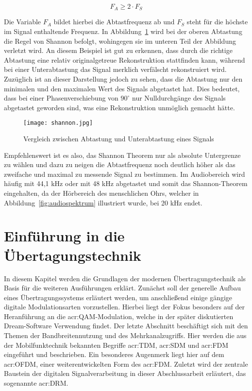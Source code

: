\begin{equation}
	\label{equ:abtast}
	F_{A} \geq 2 \cdot F_{S}
\end{equation}

Die Variable $F_{A}$ bildet hierbei die Abtastfrequenz ab und $F_{S}$ steht für die höchste im Signal enthaltende Frequenz. In Abbildung~\ref{fig:shannon} wird bei der oberen Abtastung die Regel von Shannon befolgt, wohingegen sie im unteren Teil der Abbildung verletzt wird. An diesem Beispiel ist gut zu erkennen, dass durch die richtige Abtastung eine relativ originalgetreue Rekonstruktion stattfinden kann, während bei einer Unterabtastung das Signal merklich verfälscht rekonstruiert wird. Zuzüglich ist an dieser Darstellung jedoch zu sehen, dass die Abtastung nur den minimalen und den maximalen Wert des Signals abgetastet hat.\cite{shannon} Dies bedeutet, dass bei einer Phasenverschiebung von $90^\circ$ nur Nulldurchgänge des Signals abgetastet geworden sind, was eine Rekonstruktion unmöglich gemacht hätte. 

\begin{figure}[H]
	\centering
	\texttt{[image: shannon.jpg]}
	\caption[Vergleich zwischen Abtastung und Unterabtastung eines Signals]{Vergleich zwischen Abtastung und Unterabtastung eines Signals} \cite{stotzaudio}
	\label{fig:shannon}
\end{figure}

Empfehlenswert ist es also, das Shannon Theorem nur als absolute Untergrenze zu wählen und dazu zu neigen die Abtastfrequenz noch deutlich höher als das zweifache und maximal zu messende Signal zu bestimmen.\cite{stotzaudio} Im Audiobereich wird häufig mit 44,1 kHz oder mit 48 kHz abgetastet und somit das Shannon-Theorem eingehalten, da der Hörbereich des menschlichen Ohrs, welcher in Abbildung~\ref{fig:audiospektrum} illustriert wurde, bei 20 kHz endet. \cite{masteraudio}


\section{Einführung in die Übertagungstechnik}
\label{subsec:uebertragung}
In diesem Kapitel werden die Grundlagen der modernen Übertragungstechnik als Basis für die weiteren Ausführungen erklärt. Zunächst soll der generelle Aufbau eines Übertragungssystems erläutert werden, um anschließend einige gängige digitale Modulationsarten vorzustellen. Hierbei liegt der Fokus besonders auf der Heranführung an die \gls{acr:QAM}-Modulation, welche in der später diskutierten Dream-Software Verwendung findet. Der letzte Abschnitt beschäftigt sich mit den Themen der Bandbreitennutzung und des Mehrkanalzugriffs. Hier werden die aus der Mobilfunktechnik bekannten Begriffe \gls{acr:TDM}, \gls{acr:SDM} und \gls{acr:FDM} eingeführt und beschrieben. Ein besonderes Augenmerk liegt hier auf dem \gls{acr:OFDM}, einer weiterentwickelten Form des \gls{acr:FDM}. Zuletzt wird der zentrale Baustein der digitalen Signalverarbeitung in dieser Abschlussarbeit erläutert, das sogenannte \gls{acr:DRM}.

